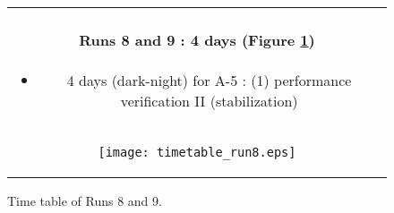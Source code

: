 \begin{figure}[!ht]
\begin{center}
\begin{tabular}{c}
\begin{minipage}{0.95\hsize}
\paragraph{Runs 8 and 9 : 4 days  (Figure \ref{fig:run8})}
	\begin{itemize}
	\item 4 days (dark-night) for A-5 :
	(1) performance verification II (stabilization)
	\end{itemize}
\end{minipage} \\
\begin{minipage}{0.8\hsize}
	\begin{center}
	\vspace*{5mm}
	\texttt{[image: timetable\_run8.eps]}
	\end{center}
	\vspace*{-5mm}
	\caption{Time table of Runs 8 and 9.}
	\label{fig:run8}
\end{minipage}
\end{tabular}
\end{center}
\end{figure}


